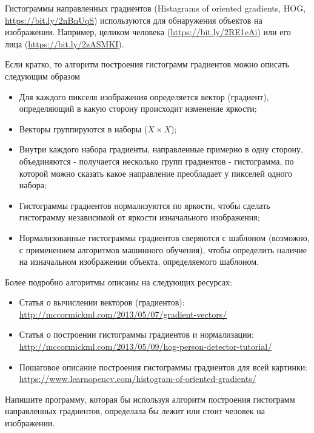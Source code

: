 
Гистограммы направленных градиентов (Histagrams of oriented gradients, HOG, \url{https://bit.ly/2nBnUqS}) используются для обнаружения объектов на изображении.
Например, целиком человека (\url{https://bit.ly/2RE1eAi}) или его лица (\url{https://bit.ly/2zASMKI}).

Если кратко, то алгоритм построения гистограмм градиентов можно описать следующим образом
\begin{itemize}
  \item Для каждого пикселя изображения определяется вектор (градиент), определяющий в какую сторону происходит изменение яркости;
  \item Векторы группируются в наборы ($X \times X$);
  \item Внутри каждого набора градиенты, направленные примерно в одну сторону, объединяются - получается несколько групп градиентов - гистограмма, по которой можно сказать какое направление преобладает у пикселей одного набора;
  \item Гистограммы градиентов нормализуются по яркости, чтобы сделать гистограмму независимой от яркости изначального изображения;
  \item Нормализованные гистограммы градиентов сверяются с шаблоном (возможно, с применением алгоритмов машинного обучения), чтобы определить наличие на изначальном изображении объекта, определяемого шаблоном. 
\end{itemize}

Более подробно алгоритмы описаны на следующих ресурсах:
\begin{itemize}
  \item Статья о вычислении векторов (градиентов): \url{http://mccormickml.com/2013/05/07/gradient-vectors/}
  \item Статья о построении гистограммы градиентов и нормализации: \\ \url{http://mccormickml.com/2013/05/09/hog-person-detector-tutorial/} 
  \item Пошаговое описание построения гистограммы градиентов для всей картинки: \url{https://www.learnopencv.com/histogram-of-oriented-gradients/}
\end{itemize}

Напишите программу, которая бы используя алгоритм построения гистограмм направленных градиентов, определала бы лежит или стоит человек на изображении.


